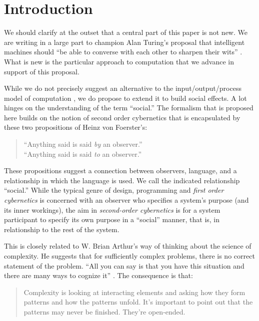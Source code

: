 \section{Introduction}
\label{sec:intro}

We should clarify at the outset that a central part of this paper is
not new.  We are writing in a large part to champion Alan Turing's
proposal that intelligent machines should ``be able to converse with
each other to sharpen their wits'' \cite{turing-intelligent}.  What is
new is the particular approach to computation that we advance in
support of this proposal.

While we do not precisely suggest an alternative to the
input/output/process model of computation \cite{marr1981vision}, we do
propose to extend it to build social effects.  A lot hinges on the
understanding of the term ``social.''  The formalism that is proposed
here builds on the notion of second order cybernetics that is
encapsulated by these two propositions of Heinz von Foerster's:

\begin{quote}
``Anything said is said \emph{by} an observer.'' \\
``Anything said is said \emph{to} an observer.''\\
\end{quote}

These propositions suggest a connection between observers, language,
and a relationship in which the language is used.  We call the
indicated relationship ``social.''  While the typical genre of design,
programming and \emph{first order cybernetics} is concerned with an
observer who specifies a system's purpose (and its inner workings),
the aim in \emph{second-order cybernetics} is for a system participant
to specify its own purpose in a ``social'' manner, that is, in
relationship to the rest of the system.

This is closely related to W. Brian Arthur's way of thinking about the
science of complexity.  He suggests that for sufficiently complex
problems, there is no correct statement of the problem.  ``All you can
say is that you have this situation and there are many ways to cognize
it'' \citep{brian-arthur-interview}.  The consequence is that:

\begin{quote}
Complexity is looking at interacting elements and asking how they form
patterns and how the patterns unfold.  It’s important to point out
that the patterns may never be finished.  They're open-ended.
\end{quote}

